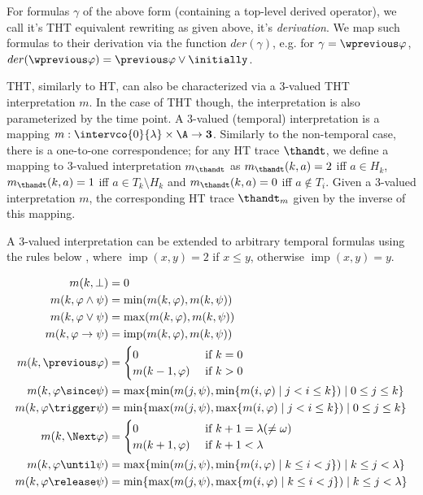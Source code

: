 For formulas $\gamma$ of the above form (containing a top-level
derived operator), we call it's THT equivalent rewriting as given
above, it's \textit{derivation}. We map such formulas to their
derivation via the function $der(\gamma)$, e.g. for
$\gamma = \wprevious \varphi$,
$der(\wprevious \varphi) = \previous \varphi \vee \initially$.

THT, similarly to HT, can also be characterized via a 3-valued THT
interpretation $m$. In the case of THT though, the interpretation is
also parameterized by the time point. A 3-valued (temporal)
interpretation is a mapping
$m: \intervco{0}{\lambda} \times \A \rightarrow \textbf{3}$. Similarly
to the non-temporal case, there is a one-to-one correspondence; for
any HT trace $\thandt$, we define a mapping to 3-valued interpretation
$m_{\thandt}$ as $m_{\thandt}(k,a)=2$ iff $a \in H_k$,
$m_{\thandt}(k,a)=1$ iff $a \in T_k \setminus H_k$ and
$m_{\thandt}(k,a)=0$ iff $a \not\in T_i$. Given a 3-valued
interpretation $m$, the corresponding HT trace $\thandt_m$ given by the
inverse of this mapping.

A 3-valued interpretation can be extended to arbitrary temporal
formulas using the rules below \cite{agcadipescscvi20a}, where
$\operatorname{imp}(x,y)=2$ if $x \leq y$, otherwise
$\operatorname{imp}(x,y)=y$.
\begin{definition}\label{def:3-valued-extension-temporal}
\begin{align*}
  m(k, \perp) &= 0 \\
  m(k, \varphi \wedge \psi) &= \min (m(k, \varphi), m(k, \psi)) \\
  m(k, \varphi \vee \psi) &= \max (m(k, \varphi), m(k, \psi)) \\
  m(k, \varphi \rightarrow \psi) &= \operatorname{imp}(m(k, \varphi), m(k, \psi)) \\
  m(k, \previous \varphi) &= \begin{cases}
    0 & \text { if } k=0 \\
    m(k-1, \varphi) & \text { if } k>0
  \end{cases} \\
 m(k, \varphi \since \psi) &= \max \{\min (m(j, \psi), \min \{m(i, \varphi) \mid j<i \leq k\}) \mid 0 \leq j \leq k\} \\
 m(k, \varphi \trigger \psi) &= \min \{\max (m(j, \psi), \max \{m(i, \varphi) \mid j<i \leq k\}) \mid 0 \leq j \leq k\} \\
 m(k, \Next \varphi) &= \begin{cases}0 & \text { if } k+1=\lambda(\neq \omega) \\
m(k+1, \varphi) & \text { if } k+1<\lambda\end{cases} \\
 m(k, \varphi \until \psi) &= \max \{\min (m(j, \psi), \min \{m(i, \varphi) \mid k \leq i<j\}) \mid k \leq j<\lambda\} \\
 m(k, \varphi \release \psi) &= \min \{\max (m(j, \psi), \max \{m(i, \varphi) \mid k \leq i<j\}) \mid k \leq j<\lambda\}
\end{align*}
\end{definition}

